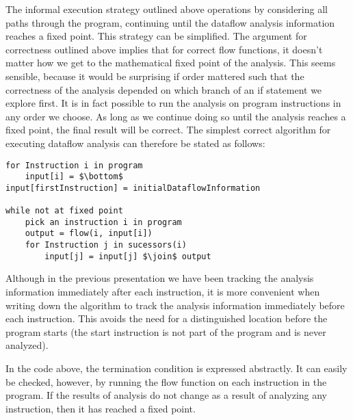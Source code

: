 \documentclass[11pt]{article}
\newcommand{\join}{\sqcup}
\begin{document}
The informal execution strategy outlined above operations by considering all
paths through the program, continuing until the dataflow analysis information
reaches a fixed point.  This strategy can be simplified.  The argument for
correctness outlined above implies that for correct flow functions, it doesn't
matter how we get to the mathematical fixed point of the analysis.  This seems
sensible, because it would be surprising if order mattered such that the
correctness of the analysis depended on which branch of an if statement we
explore first.  It is in fact possible to run the analysis on program
instructions in any order we choose.  As long as we continue doing so until the
analysis reaches a fixed point, the final result will be correct.  The simplest
correct algorithm for executing dataflow analysis can therefore be stated as
follows:

%

\begin{lstlisting}[mathescape]
for Instruction i in program
    input[i] = $\bottom$
input[firstInstruction] = initialDataflowInformation

while not at fixed point
    pick an instruction i in program
    output = flow(i, input[i])
    for Instruction j in sucessors(i)
        input[j] = input[j] $\join$ output
\end{lstlisting}

Although in the previous presentation we have been tracking the analysis
information immediately after each instruction, it is more convenient when
writing down the algorithm to track the analysis information immediately before
each instruction.  This avoids the need for a distinguished location before the
program starts (the start instruction is not part of the program and is never
analyzed).


In the code above, the termination condition is expressed abstractly.  It can
easily be checked, however, by running the flow function on each instruction in
the program.  If the results of analysis do not change as a result of analyzing
any instruction, then it has reached a fixed point.
\end{document}
